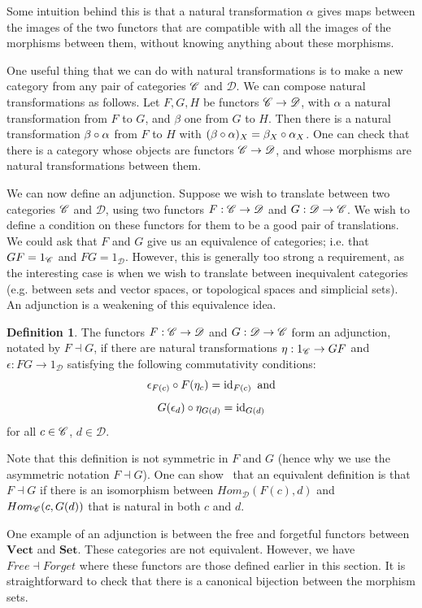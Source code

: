 \documentclass[a4paper,11pt,leqno]{article} \usepackage{amsmath}
\newcommand{\curD}{\mathscr{D}} \newcommand{\curI}{\mathscr{I}}
\newcommand{\id}{\ensuremath{\operatorname{id}}}
\theoremstyle{definition}
\newtheorem{defn}{Definition}
\begin{document}
Some intuition behind this is that a natural transformation $\alpha$ gives maps
between the images of the two functors that are compatible with all the
images of the morphisms between them, without knowing anything about these
morphisms. 

One useful thing that we can do with natural transformations is to make a new
category from any pair of categories $\mathscr{C}$ and $\curD$.
We can compose natural transformations as follows.
Let $F, G, H$ be functors $\curC\to \curD$, with $\alpha$ a natural
transformation from $F$ to $G$, and $\beta$ one from $G$ to $H$.
Then there is a natural transformation $\beta\circ\alpha$ from $F$ to $H$ with
$(\beta\circ\alpha)_X = \beta_X\circ\alpha_X$.
One can check that there is a category whose objects are functors
$\curC\to\curD$, and whose morphisms are natural transformations between them.

We can now define an adjunction.
Suppose we wish to translate between two categories $\mathscr{C}$ and $\curD$, using
two functors $F: \curC\to \curD$ and $G: \curD\to\curC$.
We wish to define a condition on these functors for them to be a good pair of
translations.
We could ask that $F$ and $G$ give us an equivalence of categories; i.e. that
$GF = 1_{\mathscr{C}}$ and $FG = 1_{\curD}$.
However, this is generally too strong a requirement, as the interesting case is
when we wish to translate between inequivalent categories (e.g. between sets
and vector spaces, or topological spaces and simplicial sets).
An adjunction is a weakening of this equivalence idea. 

\begin{defn}
  The functors $F: \curC\to\curD$ and $G: \curD\to\curC$ form an adjunction,
  notated by $F\dashv G$, if there are natural transformations $\eta:
  1_{\mathscr{C}}\to GF$ and $\epsilon: FG\to 1_\curD$ satisfying the following 
  commutativity conditions:
  $$\epsilon_{F(c)}\of F(\eta_c) = \id_{F(c)}\text{ and} $$
  $$G(\epsilon_d)\of \eta_{G(d)} = \id_{G(d)}$$
  for all $c\in\mathscr{C}$, $d\in\curD$.
\end{defn}

Note that this definition is not symmetric in $F$ and $G$ (hence why we use the
asymmetric notation $F\dashv G$).
One can show~\cite[Section 4]{Riehl} that an equivalent definition is that
$F\dashv G$ if there is an isomorphism between $Hom_\curD(F(c), d)$ and
$Hom_{\mathscr{C}}(c, G(d))$ that is natural in both $c$ and $d$.

One example of an adjunction is between the free and forgetful functors between
$\textbf{Vect}$ and $\textbf{Set}$.
These categories are not equivalent.
However, we have $Free\dashv Forget$ where these functors are those defined
earlier in this section.
It is straightforward to check that there is a canonical bijection between the
morphism sets.
\end{document}
